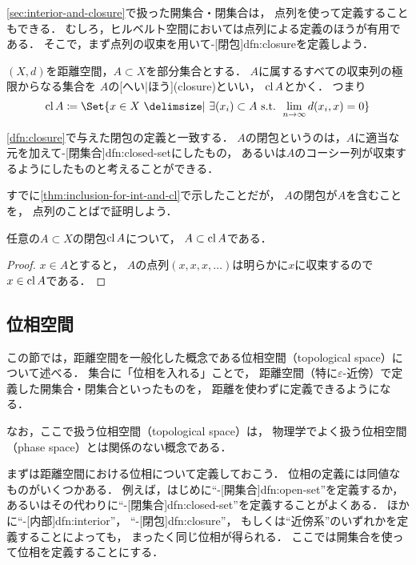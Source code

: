 \documentclass[../sotsu.tex]{subfiles}
\begin{document}
\cref{sec:interior-and-closure}で扱った開集合・閉集合は，
点列を使って定義することもできる．
むしろ，ヒルベルト空間においては点列による定義のほうが有用である．
そこで，まず点列の収束を用いて-[閉包]{dfn:closure}を定義しよう．

\begin{definition}[点列による閉包の定義]
    \label{dfn:closure-by-sequence}
    $(X, d)$を距離空間，$A \subset X$を部分集合とする．
    $A$に属するすべての収束列の極限からなる集合を
    $A$の[へい|ほう](closure)といい，
    $\operatorname{cl}{A}$とかく．
    つまり
    \begin{equation}
        \clsr{A} \coloneq \Set{ x \in X  \given  \exists (x_i) \subset A \text{ s.t. } \lim_{n \to \infty} d(x_i, x) = 0 }
    \end{equation}
\end{definition}

\cref{dfn:closure}で与えた閉包の定義と一致する．
$A$の閉包というのは，$A$に適当な元を加えて-[閉集合]{dfn:closed-set}にしたもの，
あるいは$A$のコーシー列が収束するようにしたものと考えることができる．

すでに\cref{thm:inclusion-for-int-and-cl}で示したことだが，
$A$の閉包が$A$を含むことを，
点列のことばで証明しよう．

\begin{corollary}
    任意の$A \subset X$の閉包$\operatorname{cl}{A}$について，
    $A \subset \operatorname{cl}{A}$である．
\end{corollary}

\begin{proof}
    $x \in A$とすると，
    $A$の点列$(x, x, x, \dotsc)$は明らかに$x$に収束するので$x \in \operatorname{cl}{A}$である．
\end{proof}



\subsection{位相空間}

この節では，距離空間を一般化した概念である位相空間（topological space）について述べる．
集合に「位相を入れる」ことで，
距離空間（特に$\varepsilon$-近傍）で定義した開集合・閉集合といったものを，
距離を使わずに定義できるようになる．

なお，ここで扱う位相空間（topological space）は，
物理学でよく扱う位相空間（phase space）とは関係のない概念である．

まずは距離空間における位相について定義しておこう．
位相の定義には同値なものがいくつかある．
例えば，はじめに``-[開集合]{dfn:open-set}''を定義するか，
あるいはその代わりに``-[閉集合]{dfn:closed-set}''を定義することがよくある．
ほかに``-[内部]{dfn:interior}''，
``-[閉包]{dfn:closure}''，
もしくは``近傍系''のいずれかを定義することによっても，
まったく同じ位相が得られる．
ここでは開集合を使って位相を定義することにする．
\end{document}
